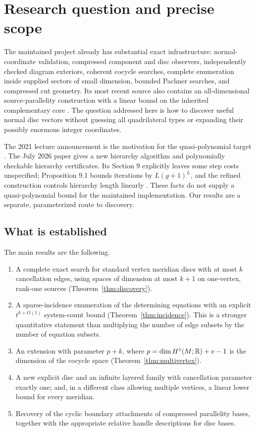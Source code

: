\section{Research question and precise scope}
\label{sec:scope}

The maintained project already has substantial exact infrastructure:
normal-coordinate validation, compressed component and disc observers,
independently checked diagram exteriors, coherent cocycle searches,
complete enumeration inside supplied sectors of small dimension,
bounded Pachner searches, and compressed cut geometry. Its most recent
source also contains an all-dimensional source-parallelity construction
with a linear bound on the inherited complementary core
\cite{repo}. The question addressed here is how to discover useful normal
disc vectors without guessing all quadrilateral types or expanding their
possibly enormous integer coordinates.

The 2021 lecture announcement is the motivation for the quasi-polynomial
target \cite{slides}. The July 2026 paper gives a new hierarchy algorithm
and polynomially checkable hierarchy certificates. Its Section 9 explicitly
leaves some step costs unspecified; Proposition 9.1 bounds iterations by
$L(g+1)^L$, and the refined construction controls hierarchy length linearly
\cite{lackenby2026}. These facts do not supply a quasi-polynomial bound for
the maintained implementation. Our results are a separate, parameterized
route to discovery.

\subsection{What is established}

The main results are the following.
\begin{enumerate}
\item A complete exact search for standard vertex meridian discs with
at most $k$ cancellation edges, using spaces of dimension at most $k+1$
on one-vertex, rank-one sources (Theorem~\ref{thm:discovery}).
\item A sparse-incidence enumeration of the determining equations with
an explicit $t^{k+O(1)}$ system-count bound
(Theorem~\ref{thm:incidence}). This is a stronger quantitative statement
than multiplying the number of edge subsets by the number of equation
subsets.
\item An extension with parameter $p+k$, where
$p=\dim H^1(M;\mathbb R)+v-1$ is the dimension of the cocycle space
(Theorem~\ref{thm:multivertex}).
\item A new explicit disc and an infinite layered family with cancellation
parameter exactly one; and, in a different class allowing multiple
vertices, a linear lower bound for every meridian.
\item Recovery of the cyclic boundary attachments of compressed
parallelity bases, together with the appropriate relative handle
descriptions for disc bases.
\end{enumerate}

